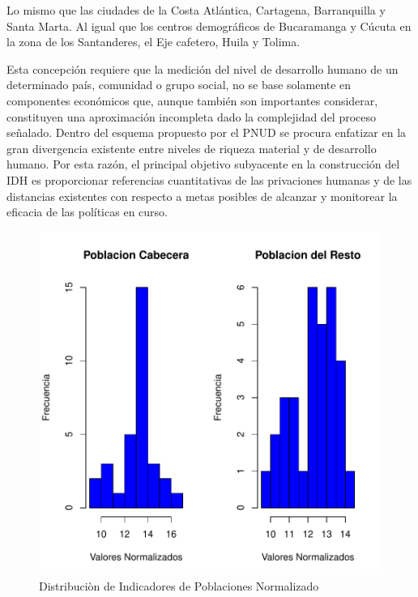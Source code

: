 Lo mismo que las ciudades de la Costa Atlántica, Cartagena, Barranquilla y Santa Marta. Al igual que los centros demográficos de Bucaramanga y Cúcuta en la zona de los Santanderes, el Eje cafetero, Huila y Tolima.


Esta concepción requiere que la medición del nivel de desarrollo humano de un determinado país, comunidad o grupo social, no se base solamente en componentes económicos que, aunque también son importantes considerar, constituyen una aproximación incompleta dado la complejidad del proceso señalado. Dentro del esquema propuesto por el PNUD se procura enfatizar en la gran divergencia existente entre niveles de riqueza material y de desarrollo humano. Por esta razón, el principal objetivo subyacente en la construcción del IDH es proporcionar referencias cuantitativas de las privaciones humanas y de las distancias existentes con respecto a metas posibles de alcanzar y monitorear la eficacia de las políticas en curso. 


\begin{figure}[h]
\includegraphics{univariada-hist1}
\caption{Distribuciòn de Indicadores de Poblaciones Normalizado}
\label{hist1}
\end{figure}

